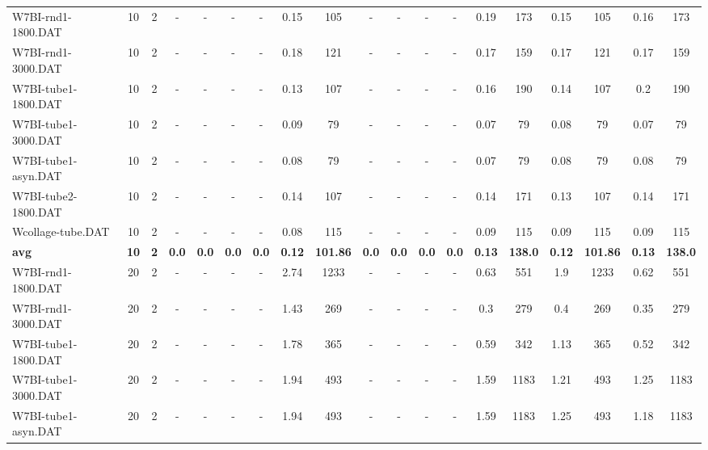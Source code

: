 \begin{sidewaystable}[!ht]
{\begin{tabular}{lcccccccccccccccccc}
W7BI-rnd1-1800.DAT & 10 & 2 &  - &  - &  - &  - &  \textcolor{blue2}{0.15} & 105 &  - &  - &  - &  - & 0.19 & 173 &  \textcolor{blue2}{0.15} & 105 & 0.16 & 173 \\
W7BI-rnd1-3000.DAT & 10 & 2 &  - &  - &  - &  - & 0.18 & 121 &  - &  - &  - &  - &  \textcolor{blue2}{0.17} & 159 &  \textcolor{blue2}{0.17} & 121 &  \textcolor{blue2}{0.17} & 159 \\
W7BI-tube1-1800.DAT & 10 & 2 &  - &  - &  - &  - &  \textcolor{blue2}{0.13} & 107 &  - &  - &  - &  - & 0.16 & 190 & 0.14 & 107 & 0.2 & 190 \\
W7BI-tube1-3000.DAT & 10 & 2 &  - &  - &  - &  - & 0.09 & 79 &  - &  - &  - &  - &  \textcolor{blue2}{0.07} & 79 & 0.08 & 79 &  \textcolor{blue2}{0.07} & 79 \\
W7BI-tube1-asyn.DAT & 10 & 2 &  - &  - &  - &  - & 0.08 & 79 &  - &  - &  - &  - &  \textcolor{blue2}{0.07} & 79 & 0.08 & 79 & 0.08 & 79 \\
W7BI-tube2-1800.DAT & 10 & 2 &  - &  - &  - &  - & 0.14 & 107 &  - &  - &  - &  - & 0.14 & 171 &  \textcolor{blue2}{0.13} & 107 & 0.14 & 171 \\
Wcollage-tube.DAT & 10 & 2 &  - &  - &  - &  - &  \textcolor{blue2}{0.08} & 115 &  - &  - &  - &  - & 0.09 & 115 & 0.09 & 115 & 0.09 & 115 \\
\cline{1-19} \textbf{avg} & \textbf{10} & \textbf{2} & \textbf{0.0} & \textbf{0.0} & \textbf{0.0} & \textbf{0.0} & \textbf{0.12} & \textbf{101.86} & \textbf{0.0} & \textbf{0.0} & \textbf{0.0} & \textbf{0.0} & \textbf{0.13} & \textbf{138.0} & \textbf{0.12} & \textbf{101.86} & \textbf{0.13} & \textbf{138.0} \\ \cline{1-19}
W7BI-rnd1-1800.DAT & 20 & 2 &  - &  - &  - &  - & 2.74 & 1233 &  - &  - &  - &  - & 0.63 & 551 & 1.9 & 1233 &  \textcolor{blue2}{0.62} & 551 \\
W7BI-rnd1-3000.DAT & 20 & 2 &  - &  - &  - &  - & 1.43 & 269 &  - &  - &  - &  - &  \textcolor{blue2}{0.3} & 279 & 0.4 & 269 & 0.35 & 279 \\
W7BI-tube1-1800.DAT & 20 & 2 &  - &  - &  - &  - & 1.78 & 365 &  - &  - &  - &  - & 0.59 & 342 & 1.13 & 365 &  \textcolor{blue2}{0.52} & 342 \\
W7BI-tube1-3000.DAT & 20 & 2 &  - &  - &  - &  - & 1.94 & 493 &  - &  - &  - &  - & 1.59 & 1183 &  \textcolor{blue2}{1.21} & 493 & 1.25 & 1183 \\
W7BI-tube1-asyn.DAT & 20 & 2 &  - &  - &  - &  - & 1.94 & 493 &  - &  - &  - &  - & 1.59 & 1183 & 1.25 & 493 &  \textcolor{blue2}{1.18} & 1183 \\

\end{tabular}}
\end{sidewaystable}
